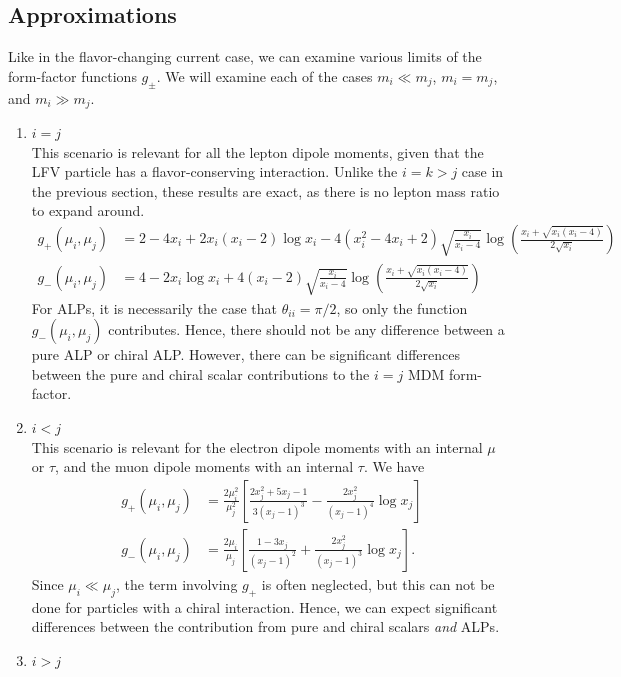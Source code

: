 {\subsection{Approximations}\label{sec:diagonal_approx}
Like in the flavor-changing current case, we can examine various limits of the form-factor functions $g_{\pm}$. We will examine each of the cases $m_i \ll m_j$, $m_i = m_j$, and $m_i \gg m_j$.
\begin{enumerate}
    \item $i = j$\\
        This scenario is relevant for all the lepton dipole moments, given that the LFV particle has a flavor-conserving interaction. Unlike the $i = k > j$ case in the previous section, these results are exact, as there is no lepton mass ratio to expand around.
        \begin{align}
        g_+(\mu_i, \mu_j) &= 2-4x_i + 2x_i(x_i - 2)\log{x_i}- 4(x_i^2 - 4x_i + 2)\sqrt{\frac{x_i}{x_i - 4}}\log{\left(\frac{x_i + \sqrt{x_i(x_i - 4)}}{2\sqrt{x_i}}\right)}\nonumber\\
        g_-(\mu_i, \mu_j)&= 4-2x_i\log{x_i} + 4(x_i - 2)\sqrt{\frac{x_i}{x_i - 4}}\log{\left(\frac{x_i + \sqrt{x_i(x_i - 4)}}{2\sqrt{x_i}}\right)}
        \end{align}
        For ALPs, it is necessarily the case that $\theta_{ii} = \pi/2$, so only the function $g_-(\mu_i,\mu_j)$ contributes. Hence, there should not be any difference between a pure ALP or chiral ALP. However, there can be significant differences between the pure and chiral scalar contributions to the $i = j$ MDM form-factor.
    \item $i < j$\\
        This scenario is relevant for the electron dipole moments with an internal $\mu$ or $\tau$, and the muon dipole moments with an internal $\tau$. We have
        \begin{align}
        g_+(\mu_i, \mu_j) &= \frac{2\mu_i^2}{\mu_j^2}\left[\frac{2x_j^2 + 5x_j - 1}{3(x_j-1)^3}-\frac{2x_j^2}{(x_j-1)^4}\log{x_j}\right]\nonumber\\
        g_-(\mu_i,\mu_j) &= \frac{2\mu_i}{\mu_j}\left[\frac{1 - 3x_j}{(x_j-1)^2}+\frac{2x_j^2}{(x_j-1)^3}\log{x_j}\right].
        \end{align}
    Since $\mu_i \ll \mu_j$, the term involving $g_+$ is often neglected, but this can not be done for particles with a chiral interaction. Hence, we can expect significant differences between the contribution from pure and chiral scalars {\it and} ALPs.
    \item $i > j$\\

\end{enumerate}}
